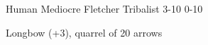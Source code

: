 
\begin{filledCS}%
  {\composeHumanName}%
  {Human}%
  {Mediocre Fletcher}%
  {Tribalist}%
  {{3}{-1}{0}}%
  {{0}{-1}{0}}%
  {%
    \setcounter{Athletics}{1}
    \setcounter{Crafts}{2}
    \setcounter{Cultivation}{1}
    \setcounter{Empathy}{1}
    \setcounter{Survival}{1}

    \setcounter{Projectiles}{1}
    \greatsword
    \partialchain
  }%
  {\guardian}%
  {Longbow (+3), quarrel of 20 arrows}%
  \renewcommand\rank{Fodder}
  \renewcommand\characterDebt{100 \glspl{sp}}

\end{filledCS}

